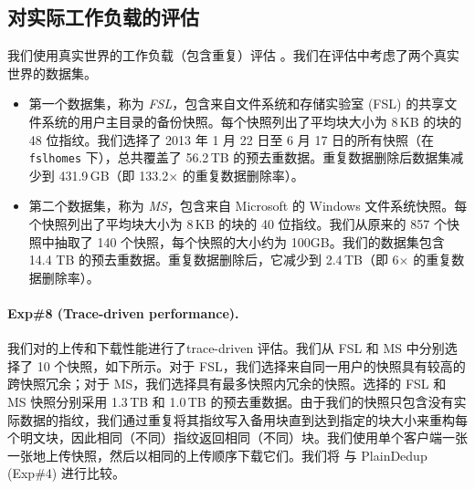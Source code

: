 \subsection{对实际工作负载的评估}
\label{subsec:real-world}

我们使用真实世界的工作负载（包含重复）评估 \sysname。我们在评估中考虑了两个真实世界的数据集。
\begin{itemize}[leftmargin=*]
\item 第一个数据集，称为 {\em FSL}，包含来自文件系统和存储实验室 (FSL) \cite{fsl,sun16} 的共享文件系统的用户主目录的备份快照。每个快照列出了平均块大小为 8\,KB 的块的 48 位指纹。我们选择了 2013 年 1 月 22 日至 6 月 17 日的所有快照（在 \texttt{fslhomes} 下），总共覆盖了 56.2\,TB 的预去重数据。重复数据删除后数据集减少到 431.9\,GB（即 133.2$\times$ 的重复数据删除率）。
\item 第二个数据集，称为 {\em MS}，包含来自 Microsoft \cite{meyer11} 的 Windows 文件系统快照。每个快照列出了平均块大小为 8\,KB 的块的 40 位指纹。我们从原来的 857 个快照中抽取了 140 个快照，每个快照的大小约为 100GB。我们的数据集包含 14.4 TB 的预去重数据。重复数据删除后，它减少到 2.4\,TB（即 6$\times$ 的重复数据删除率）。
\end{itemize}



\paragraph{Exp\#8 (Trace-driven performance).} 我们对\sysname 的上传和下载性能进行了trace-driven 评估。我们从 FSL 和 MS 中分别选择了 10 个快照，如下所示。对于 FSL，我们选择来自同一用户的快照具有较高的跨快照冗余；对于 MS，我们选择具有最多快照内冗余的快照。选择的 FSL 和 MS 快照分别采用 1.3\,TB 和 1.0\,TB 的预去重数据。由于我们的快照只包含没有实际数据的指纹，我们通过重复将其指纹写入备用块直到达到指定的块大小来重构每个明文块，因此相同（不同）指纹返回相同（不同）块。我们使用单个客户端一张一张地上传快照，然后以相同的上传顺序下载它们。我们将 \sysname 与 PlainDedup (Exp\#4) 进行比较。

